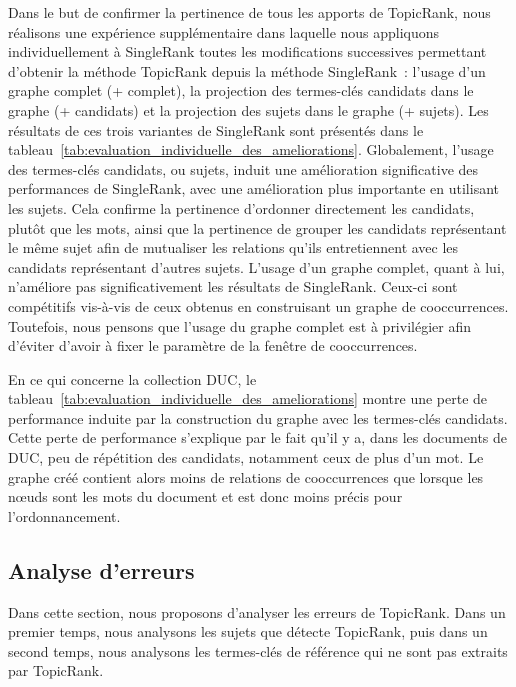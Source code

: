         Dans le but de confirmer la pertinence de tous les apports de TopicRank,
        nous réalisons une expérience supplémentaire dans laquelle nous
        appliquons individuellement à SingleRank toutes les modifications
        successives permettant d'obtenir la méthode TopicRank depuis la méthode
        SingleRank~: l'usage d'un graphe complet (+ complet), la projection des
        termes-clés candidats dans le graphe (+ candidats) et la projection des
        sujets dans le graphe (+ sujets). Les résultats de ces trois variantes
        de SingleRank sont présentés dans le
        tableau~\ref{tab:evaluation_individuelle_des_ameliorations}.
        Globalement, l'usage des termes-clés candidats, ou sujets, induit une
        amélioration significative des performances de SingleRank, avec une
        amélioration plus importante en utilisant les sujets. Cela confirme la
        pertinence d'ordonner directement les candidats, plutôt que les mots,
        ainsi que la pertinence de grouper les candidats représentant le même
        sujet afin de mutualiser les relations qu'ils entretiennent avec les
        candidats représentant d'autres sujets. L'usage d'un graphe complet,
        quant à lui, n'améliore pas significativement les résultats de
        SingleRank. Ceux-ci sont compétitifs vis-à-vis de ceux obtenus en
        construisant un graphe de cooccurrences. Toutefois, nous pensons que
        l'usage du graphe complet est à privilégier afin d'éviter d'avoir à
        fixer le paramètre de la fenêtre de cooccurrences.
        
        En ce qui concerne la collection DUC, le
        tableau~\ref{tab:evaluation_individuelle_des_ameliorations} montre une
        perte de performance induite par la construction du graphe avec les
        termes-clés candidats. Cette perte de performance s'explique par le fait
        qu'il y a, dans les documents de DUC, peu de répétition des candidats,
        notamment ceux de plus d'un mot. Le graphe créé contient alors moins de
        relations de cooccurrences que lorsque les n\oe{}uds sont les mots du
        document et est donc moins précis pour l'ordonnancement.

      \subsection{Analyse d'erreurs}
      \label{subsec:main-automatic_keyphrase_annotation-unsupervised_automatic_keyphrase_extraction-error_analysis}
        Dans cette section, nous proposons d'analyser les erreurs de TopicRank.
        Dans un premier temps, nous analysons les sujets que détecte TopicRank,
        puis dans un second temps, nous analysons les termes-clés de référence
        qui ne sont pas extraits par Topic\-Rank.

